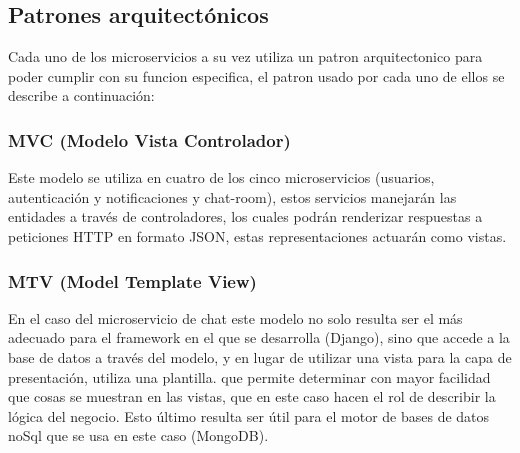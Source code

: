 \subsection{Patrones arquitectónicos}

Cada uno de los microservicios a su vez utiliza un patron arquitectonico para poder cumplir con su funcion especifica, el patron usado por cada uno de ellos se describe a continuación: \\

\subsubsection{MVC (Modelo Vista Controlador)}

Este modelo se utiliza en cuatro de los cinco microservicios (usuarios, autenticación y notificaciones y chat-room), estos servicios manejarán las entidades a través de controladores, los cuales podrán renderizar respuestas a peticiones HTTP en formato JSON, estas representaciones actuarán como vistas.


\subsubsection{MTV (Model Template View)}

En el caso del microservicio de chat este modelo no solo resulta ser el más adecuado para el framework en el que se desarrolla (Django), sino que accede a la base de datos a través del modelo, y en lugar de utilizar una vista para la capa de presentación, utiliza una plantilla. que permite determinar con mayor facilidad que cosas se muestran en las vistas, que en este caso hacen el rol de describir la lógica del negocio. Esto último resulta ser útil para el motor de bases de datos noSql que se usa en este caso (MongoDB).



    